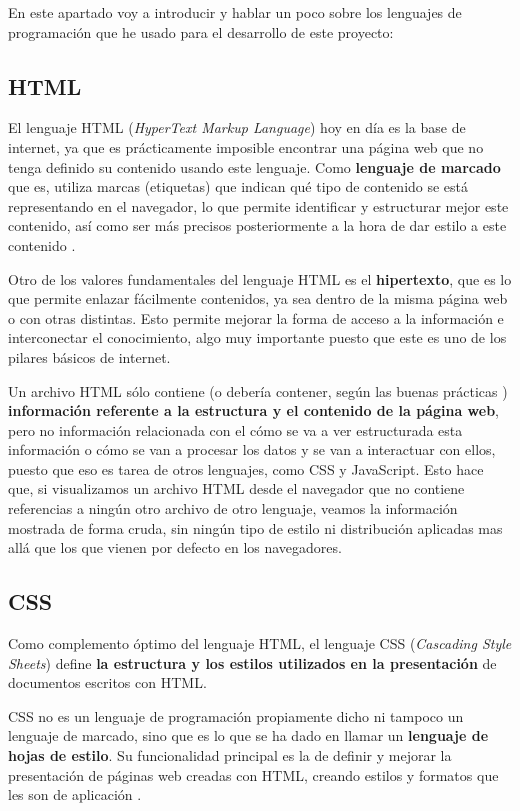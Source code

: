 En este apartado voy a introducir y hablar un poco sobre los lenguajes de programación que he usado para el desarrollo de este proyecto:

\subsection{HTML}

El lenguaje HTML (\textit{HyperText Markup Language}) hoy en día es la base de internet, ya que es prácticamente imposible encontrar una página web que no tenga definido su contenido usando este lenguaje. Como \textbf{lenguaje de marcado} que es, utiliza marcas (etiquetas) que indican qué tipo de contenido se está representando en el navegador, lo que permite identificar y estructurar mejor este contenido, así como ser más precisos posteriormente a la hora de dar estilo a este contenido \cite{mdn:html}.

Otro de los valores fundamentales del lenguaje HTML es el \textbf{hipertexto}, que es lo que permite enlazar fácilmente contenidos, ya sea dentro de la misma página web o con otras distintas. Esto permite mejorar la forma de acceso a la información e interconectar el conocimiento, algo muy importante puesto que este es uno de los pilares básicos de internet.

Un archivo HTML sólo contiene (o debería contener, según las buenas prácticas \cite{midudev:html}) \textbf{información referente a la estructura y el contenido de la página web}, pero no información relacionada con el cómo se va a ver estructurada esta información o cómo se van a procesar los datos y se van a interactuar con ellos, puesto que eso es tarea de otros lenguajes, como CSS y JavaScript. Esto hace que, si visualizamos un archivo HTML desde el navegador que no contiene referencias a ningún otro archivo de otro lenguaje, veamos la información mostrada de forma cruda, sin ningún tipo de estilo ni distribución aplicadas mas allá que los que vienen por defecto en los navegadores.

\subsection{CSS}

Como complemento óptimo del lenguaje HTML, el lenguaje CSS (\textit{Cascading Style Sheets}) define \textbf{la estructura y los estilos utilizados en la presentación} de documentos escritos con HTML.

CSS no es un lenguaje de programación propiamente dicho ni tampoco un lenguaje de marcado, sino que es lo que se ha dado en llamar un \textbf{lenguaje de hojas de estilo}. Su funcionalidad principal es la de definir y mejorar la presentación de páginas web creadas con HTML, creando estilos y formatos que les son de aplicación \cite{mdn:css}.


